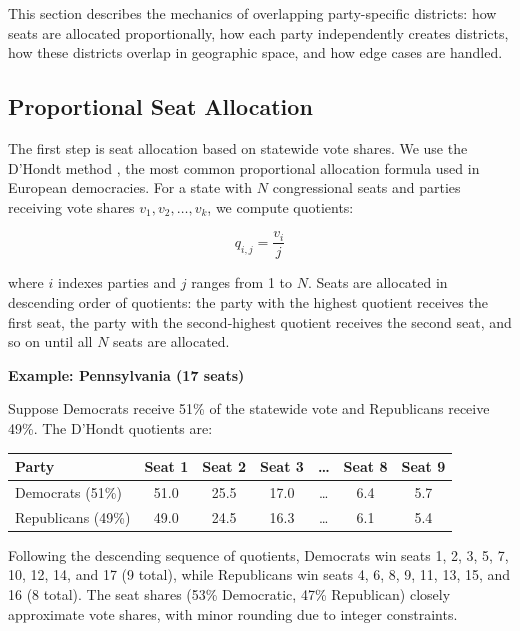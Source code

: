 
This section describes the mechanics of overlapping party-specific districts: how seats are allocated proportionally, how each party independently creates districts, how these districts overlap in geographic space, and how edge cases are handled.

\subsection{Proportional Seat Allocation}

The first step is seat allocation based on statewide vote shares. We use the D'Hondt method \citep{gallagher2011election}, the most common proportional allocation formula used in European democracies. For a state with $N$ congressional seats and parties receiving vote shares $v_1, v_2, \ldots, v_k$, we compute quotients:

\begin{equation}
q_{i,j} = \frac{v_i}{j}
\end{equation}

where $i$ indexes parties and $j$ ranges from 1 to $N$. Seats are allocated in descending order of quotients: the party with the highest quotient receives the first seat, the party with the second-highest quotient receives the second seat, and so on until all $N$ seats are allocated.

\textbf{Example: Pennsylvania (17 seats)}

Suppose Democrats receive 51\% of the statewide vote and Republicans receive 49\%. The D'Hondt quotients are:

\begin{center}
\begin{tabular}{lcccccc}
\hline
Party & Seat 1 & Seat 2 & Seat 3 & \ldots & Seat 8 & Seat 9 \\
\hline
Democrats (51\%) & 51.0 & 25.5 & 17.0 & \ldots & 6.4 & 5.7 \\
Republicans (49\%) & 49.0 & 24.5 & 16.3 & \ldots & 6.1 & 5.4 \\
\hline
\end{tabular}
\end{center}

Following the descending sequence of quotients, Democrats win seats 1, 2, 3, 5, 7, 10, 12, 14, and 17 (9 total), while Republicans win seats 4, 6, 8, 9, 11, 13, 15, and 16 (8 total). The seat shares (53\% Democratic, 47\% Republican) closely approximate vote shares, with minor rounding due to integer constraints.

